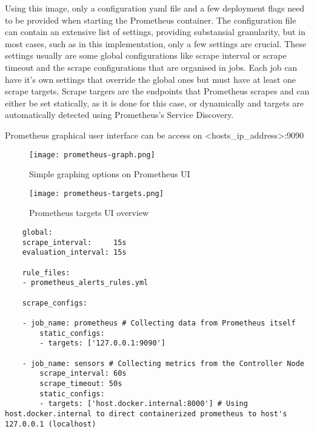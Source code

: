 Using this image, only a configuration yaml file and a few deployment flags need to be provided when starting the Prometheus container. The configuration file can contain an extensive list of settings, providing substansial granularity, but in most cases, such as in this implementation, only a few settings are crucial. These settings usually are some global configurations like scrape interval or scrape timeout and the scrape configurations that are organised in jobs. Each job can have it's own settings that override the global ones but must have at least one scrape targets. Scrape targers are the endpoints that Prometheus scrapes and can either be set statically, as it is done for this case, or dynamically and targets are automatically detected using Prometheus's Service Discovery.

Prometheus graphical user interface can be access on <hosts\_ip\_address>:9090

\begin{figure}[!h]
    \graphicspath{ {./screenshots/} }
    \texttt{[image: prometheus-graph.png]}
    \centering
    \caption{Simple graphing options on Prometheus UI}
    \label{fig:prom_graph}
\end{figure}

\begin{figure}[!h]
    \graphicspath{ {./screenshots/} }
    \texttt{[image: prometheus-targets.png]}
    \centering
    \caption{Prometheus targets UI overview}
    \label{fig:prom_targets}
\end{figure}

\begin{verbatim}
    global:
    scrape_interval:     15s
    evaluation_interval: 15s

    rule_files:
    - prometheus_alerts_rules.yml

    scrape_configs:

    - job_name: prometheus # Collecting data from Prometheus itself
        static_configs:
        - targets: ['127.0.0.1:9090']

    - job_name: sensors # Collecting metrics from the Controller Node
        scrape_interval: 60s
        scrape_timeout: 50s
        static_configs:
        - targets: ['host.docker.internal:8000'] # Using host.docker.internal to direct containerized prometheus to host's 127.0.0.1 (localhost)
\end{verbatim}

